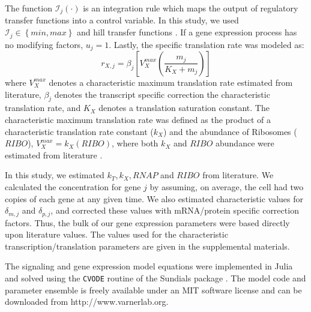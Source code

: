 \documentclass[12pt]{article}
\begin{document}
The function $\mathcal{I}_{j}\left(\cdot\right)$ is an integration rule which maps the output of regulatory transfer functions into a control
variable. In this study, we used $\mathcal{I}_{j}\in\left\{min,max\right\}$ and hill transfer functions \citep{pr3010178,pr3010138}.
If a gene expression process has no modifying factors, $u_{j}=1$.
Lastly, the specific translation rate was modeled as:
\begin{equation}
	r_{X,j} = \beta_{j}\left[V^{max}_{X}\left(\frac{m_{j}}{K_{X}+m_{j}}\right)\right]
\end{equation}where $V^{max}_{X}$ denotes a characteristic maximum translation rate estimated from literature, $\beta_{j}$ denotes the transcript specific correction the characteristic translation rate,
and $K_{X}$ denotes a translation saturation constant.
The characteristic maximum translation rate was defined as the product of a characteristic translation rate constant ($k_{X}$)
and the abundance of Ribosomes ($RIBO$), $V^{max}_{X} = k_{X}\left(RIBO\right)$, where both $k_{X}$ and $RIBO$ abundance were estimated from literature \citep{Milo:2010aa}.

In this study, we estimated $k_{T}, k_{X}, RNAP$ and $RIBO$ from literature. We calculated the concentration for gene $j$ by assuming, on average,
the cell had two copies of each gene at any given time. We also estimated characteristic values for $\delta_{m,j}$ and $\delta_{p,j}$,
and corrected these values with mRNA/protein specific correction factors. Thus, the bulk of our gene expression parameters were based directly upon literature values.
The values used for the characteristic transcription/translation parameters are given in the supplemental materials.

The signaling and gene expression model equations were implemented in Julia and solved using the \texttt{CVODE} routine of the Sundials package \citep{Julia,Hindmarsh2005}.
The model code and parameter ensemble is freely available under an MIT software license and can be downloaded from http://www.varnerlab.org.
\end{document}
